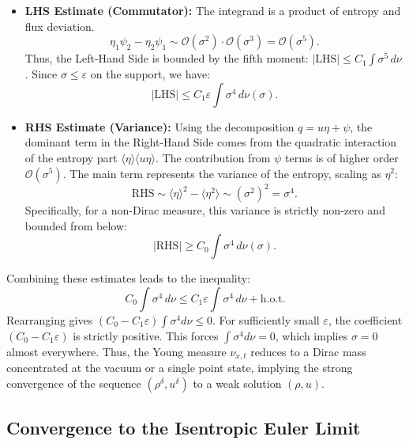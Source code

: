 \documentclass[12pt, reqno]{article}
\theoremstyle{definition}
\numberwithin{equation}{section}
\begin{document}
\begin{itemize}
    \item \textbf{LHS Estimate (Commutator):} The integrand is a product of entropy and flux deviation.
    \[
    \eta_1 \psi_2 - \eta_2 \psi_1 \sim \mathcal{O}(\sigma^2) \cdot \mathcal{O}(\sigma^3) = \mathcal{O}(\sigma^5).
    \]
    Thus, the Left-Hand Side is bounded by the fifth moment: $|\text{LHS}| \le C_1 \int \sigma^5 \, d\nu$. Since $\sigma \le \varepsilon$ on the support, we have:
    \begin{equation}
        |\text{LHS}| \le C_1 \varepsilon \int \sigma^4 \, d\nu(\sigma).
    \end{equation}

    \item \textbf{RHS Estimate (Variance):} Using the decomposition $q = u\eta + \psi$, the dominant term in the Right-Hand Side comes from the quadratic interaction of the entropy part $\langle \eta \rangle \langle u\eta \rangle$. The contribution from $\psi$ terms is of higher order $\mathcal{O}(\sigma^5)$. The main term represents the variance of the entropy, scaling as $\eta^2$:
    \[
    \text{RHS} \sim \langle \eta \rangle^2 - \langle \eta^2 \rangle \sim (\sigma^2)^2 = \sigma^4.
    \]
    Specifically, for a non-Dirac measure, this variance is strictly non-zero and bounded from below:
    \begin{equation}
        |\text{RHS}| \ge C_0 \int \sigma^4 \, d\nu(\sigma).
    \end{equation}
\end{itemize}

Combining these estimates leads to the inequality:
\begin{equation}
    C_0 \int \sigma^4 \, d\nu \le C_1 \varepsilon \int \sigma^4 \, d\nu + \text{h.o.t.}
\end{equation}
Rearranging gives $(C_0 - C_1 \varepsilon) \int \sigma^4 d\nu \le 0$. For sufficiently small $\varepsilon$, the coefficient $(C_0 - C_1 \varepsilon)$ is strictly positive. This forces $\int \sigma^4 d\nu = 0$, which implies $\sigma = 0$ almost everywhere.
Thus, the Young measure $\nu_{x,t}$ reduces to a Dirac mass concentrated at the vacuum or a single point state, implying the strong convergence of the sequence $(\rho^\delta, u^\delta)$ to a weak solution $(\rho, u)$.

\subsection{Convergence to the Isentropic Euler Limit}
\end{document}
